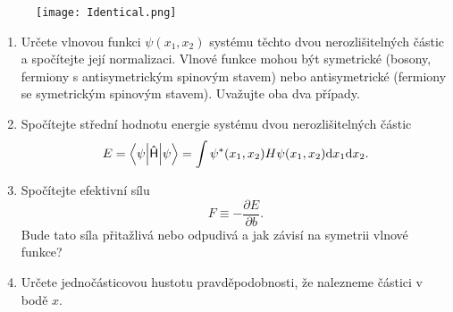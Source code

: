         \begin{figure}[htbp!]
            \centering
            \texttt{[image: Identical.png]}
        \end{figure}

        \begin{enumerate}
            \item 
                Určete vlnovou funkci $\psi(x_{1},x_{2})$ systému těchto dvou nerozlišitelných částic a spočítejte její normalizaci.
                Vlnové funkce mohou být symetrické (bosony, fermiony s antisymetrickým spinovým stavem) nebo antisymetrické (fermiony se symetrickým spinovým stavem). 
                Uvažujte oba dva případy.
            
            \item Spočítejte střední hodnotu energie systému dvou nerozlišitelných částic
                \begin{equation}
                    E=\left\langle{\psi}\middle|{\mathsf{\hat{H}}}\middle|{\psi}\right\rangle=\int\psi^{*}(x_{1},x_{2})H\psi(x_{1},x_{2})\mathrm{d} x_{1}\mathrm{d} x_{2}.
                \end{equation}

            \item Spočítejte efektivní sílu
                \begin{equation}
                    F\equiv-\frac{\partial E}{\partial b}.
                \end{equation}
                Bude tato síla přitažlivá nebo odpudivá a jak závisí na symetrii vlnové funkce?

            \item Určete jednočásticovou hustotu pravděpodobnosti, že nalezneme částici v bodě $x$.
        \end{enumerate}
